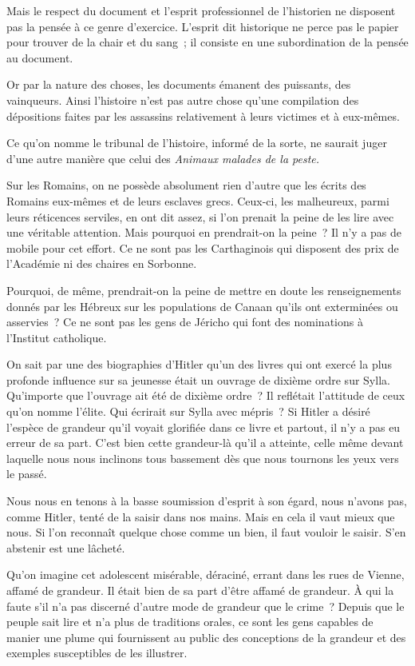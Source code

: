 \documentclass[french,twoside]{book} %
\begin{document}
Mais le respect du document et l'esprit professionnel de l'historien ne disposent pas la pensée à ce genre d'exercice. L'esprit dit historique ne perce pas le papier pour trouver de la chair et du sang ; il consiste en une subordination de la pensée au document.\par
Or par la nature des choses, les documents émanent des puissants, des vainqueurs. Ainsi l'histoire n'est pas autre chose qu'une compilation des dépositions faites par les assassins relativement à leurs victimes et à eux-mêmes.\par
Ce qu'on nomme le tribunal de l'histoire, informé de la sorte, ne saurait juger d'une autre manière que celui des {\itshape Animaux malades de la peste.}\par
Sur les Romains, on ne possède absolument rien d'autre que les écrits des Romains eux-mêmes et de leurs esclaves grecs. Ceux-ci, les malheureux, parmi leurs réticences serviles, en ont dit assez, si l'on prenait la peine de les lire avec une véritable attention. Mais pourquoi en prendrait-on la peine ? Il n'y a pas de mobile pour cet effort. Ce ne sont pas les Carthaginois qui disposent des prix de l'Académie ni des chaires en Sorbonne.\par
Pourquoi, de même, prendrait-on la peine de mettre en doute les renseignements donnés par les Hébreux sur les populations de Canaan qu'ils ont exterminées ou asservies ? Ce ne sont pas les gens de Jéricho qui font des nominations à l'Institut catholique.\par
On sait par une des biographies d'Hitler qu'un des livres qui ont exercé la plus profonde influence sur sa jeunesse était un ouvrage de dixième ordre sur Sylla. Qu'importe que l'ouvrage ait été de dixième ordre ? Il reflétait l'attitude de ceux qu'on nomme l'élite. Qui écrirait sur Sylla avec mépris ? Si Hitler a désiré l'espèce de grandeur qu'il voyait glorifiée dans ce livre et partout, il n'y a pas eu erreur de sa part. C'est bien cette grandeur-là qu'il a atteinte, celle même devant laquelle nous nous inclinons tous bassement dès que nous tournons les yeux vers le passé.\par
Nous nous en tenons à la basse soumission d'esprit à son égard, nous n'avons pas, comme Hitler, tenté de la saisir dans nos mains. Mais en cela il vaut mieux que nous. Si l'on reconnaît quelque chose comme un bien, il faut vouloir le saisir. S'en abstenir est une lâcheté.\par
\par
Qu'on imagine cet adolescent misérable, déraciné, errant dans les rues de Vienne, affamé de grandeur. Il était bien de sa part d'être affamé de grandeur. À qui la faute s'il n'a pas discerné d'autre mode de grandeur que le crime ? Depuis que le peuple sait lire et n'a plus de traditions orales, ce sont les gens capables de manier une plume qui fournissent au public des conceptions de la grandeur et des exemples susceptibles de les illustrer.\par
\end{document}
